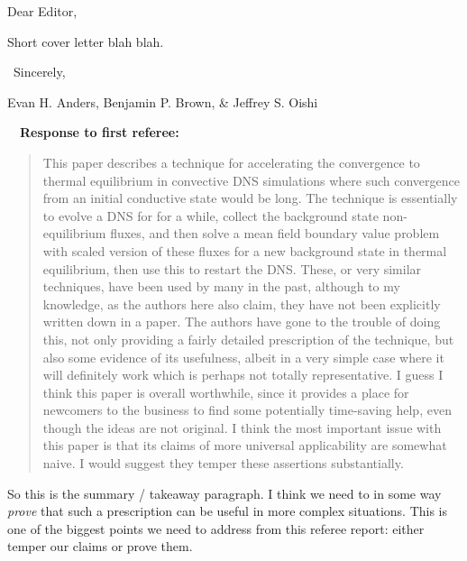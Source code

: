 \documentclass[aps, 11pt, singlecolumn]{revtex4-1} %
\begin{document}
\noindent
Dear Editor,
$\,$\newline

\newenvironment{myquotation}{
\begin{quotation}
\itshape
}{ 
\end{quotation}
}

\begin{singlespace}
Short cover letter blah blah.

$\,$\newline
\noindent
Sincerely,

Evan H. Anders, Benjamin P. Brown, \& Jeffrey S. Oishi




$\,$
\newline
$\,$
\newline
\noindent
\Large{\textbf{Response to first referee:}}\newline$\,$\newline\indent

\begin{myquotation}
This paper describes a technique for accelerating the convergence to
thermal equilibrium in convective DNS simulations where such
convergence from an initial conductive state would be long. The
technique is essentially to evolve a DNS for for a while, collect the
background state non-equilibrium fluxes, and then solve a mean field
boundary value problem with scaled version of these fluxes for a new
background state in thermal equilibrium, then use this to restart the
DNS. These, or very similar techniques, have been used by many in the
past, although to my knowledge, as the authors here also claim, they
have not been explicitly written down in a paper. The authors have
gone to the trouble of doing this, not only providing a fairly
detailed prescription of the technique, but also some evidence of its
usefulness, albeit in a very simple case where it will definitely work
which is perhaps not totally representative. I guess I think this
paper is overall worthwhile, since it provides a place for newcomers
to the business to find some potentially time-saving help, even though
the ideas are not original. I think the most important issue with this
paper is that its claims of more universal applicability are somewhat
naive. I would suggest they temper these assertions substantially.
\end{myquotation}
So this is the summary / takeaway paragraph. I think we need to
in some way \emph{prove} that such a prescription can be useful in
more complex situations. This is one of the biggest points we need to
address from this referee report: either temper our claims or prove them.


\end{singlespace}
\end{document}

